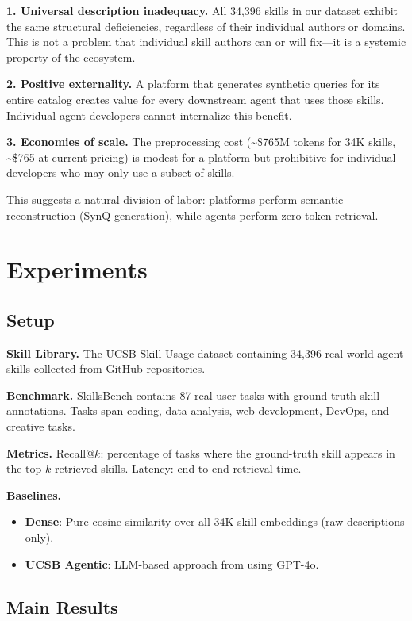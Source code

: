 \documentclass[11pt,a4paper]{article}
\begin{document}
\textbf{1. Universal description inadequacy.} All 34,396 skills in our dataset exhibit the same structural deficiencies, regardless of their individual authors or domains. This is not a problem that individual skill authors can or will fix---it is a systemic property of the ecosystem.

\textbf{2. Positive externality.} A platform that generates synthetic queries for its entire catalog creates value for every downstream agent that uses those skills. Individual agent developers cannot internalize this benefit.

\textbf{3. Economies of scale.} The preprocessing cost (\textasciitilde\$765M tokens for 34K skills, \textasciitilde\$765 at current pricing) is modest for a platform but prohibitive for individual developers who may only use a subset of skills.

This suggests a natural division of labor: platforms perform semantic reconstruction (SynQ generation), while agents perform zero-token retrieval.

\section{Experiments}
\label{sec:experiments}

\subsection{Setup}

\textbf{Skill Library.} The UCSB Skill-Usage dataset \citep{ucsb2026} containing 34,396 real-world agent skills collected from GitHub repositories.

\textbf{Benchmark.} SkillsBench \citep{ucsb2026} contains 87 real user tasks with ground-truth skill annotations. Tasks span coding, data analysis, web development, DevOps, and creative tasks.

\textbf{Metrics.} Recall@$k$: percentage of tasks where the ground-truth skill appears in the top-$k$ retrieved skills. Latency: end-to-end retrieval time.

\textbf{Baselines.}
\begin{itemize}
  \item \textbf{Dense}: Pure cosine similarity over all 34K skill embeddings (raw descriptions only).
  \item \textbf{UCSB Agentic}: LLM-based approach from \citet{ucsb2026} using GPT-4o.
\end{itemize}

\subsection{Main Results}
\end{document}

